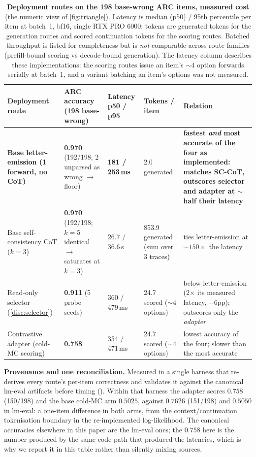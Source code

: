 \begin{table}[tbp]
\centering
\begin{threeparttable}
\caption{\textbf{Deployment routes on the 198 base-wrong ARC items, measured cost}
(the numeric view of \cref{fig:triangle}). Latency is median (p50) / 95th percentile
per item at batch~1, bf16, single RTX PRO 6000; tokens are generated tokens for the
generation routes and scored continuation tokens for the scoring routes. Batched
throughput is listed for completeness but is \emph{not} comparable across route
families (prefill-bound scoring vs decode-bound generation). The latency column
describes these implementations: the scoring routes issue an item's ${\sim}4$ option
forwards serially at batch~1, and a variant batching an item's options was not
measured.}
\label{tab:triangle}
\footnotesize
\begin{tabular}{L{3.5cm} L{3.1cm} L{2.5cm} L{1.9cm} L{2.9cm}}
\toprule
Deployment route & ARC accuracy (198 base-wrong) & Latency p50 / p95 & Tokens /
item & Relation \\
\midrule
\textbf{Base letter-emission (1 forward, no CoT)} & \textbf{0.970} (192/198; 2
unparsed as wrong $\rightarrow$ floor) & \textbf{181 / 253\,ms} & 2.0 generated &
\textbf{fastest \emph{and} most accurate of the four as implemented: matches SC-CoT,
outscores selector and adapter at ${\sim}$half their latency} \\
Base self-consistency CoT ($k{=}3$) & \textbf{0.970} (192/198; $k{=}5$ identical
$\rightarrow$ saturates at $k{=}3$) & 26.7 / 36.6\,s & 853.9 generated (sum over
3 traces) & ties letter-emission at ${\sim}150\times$ the latency \\
Read-only selector (\cref{disc:selector}) & \textbf{0.911} (5 probe seeds) & 360 /
479\,ms & 24.7 scored (${\sim}4$ options) & below letter-emission (2$\times$
its measured latency, $-6$pp); outscores only the \emph{adapter} \\
Contrastive adapter (cold-MC scoring) & \textbf{0.758} & 354 / 471\,ms & 24.7 scored
(${\sim}4$ options) & lowest accuracy of the four; slower than the most accurate \\
\bottomrule
\end{tabular}
\begin{tablenotes}[flushleft]\footnotesize
\item \textbf{Provenance and one reconciliation.} Measured in a single harness that
re-derives every route's per-item correctness and validates it against the canonical
lm-eval artifacts before timing (). Within that harness the
adapter scores $0.758$ (150/198) and the base cold-MC arm $0.5025$, against $0.7626$
(151/198) and $0.5050$ in lm-eval: a one-item difference in both arms, from the
context/continuation tokenisation boundary in the re-implemented log-likelihood. The
canonical accuracies elsewhere in this paper are the lm-eval ones; the $0.758$ here is
the number produced by the same code path that produced the latencies, which is why we
report it in this table rather than silently mixing sources.
\end{tablenotes}
\end{threeparttable}
\end{table}

